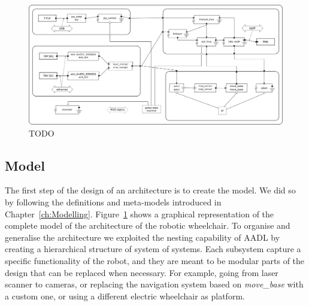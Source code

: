 \begin{landscape}
	\begin{figure}[t]
	\centering
	\includegraphics[width=0.95\textheight]{gfx/pmk/model}
	\caption{TODO}
	\label{fig:pmk-model}
	\end{figure}
\end{landscape}


\subsection{Model}
\label{sec:pmk-model}
The first step of the design of an architecture is to create the model. We did so by following the definitions and meta-models introduced in Chapter~\ref{ch:Modelling}. Figure~\ref{fig:pmk-model} shows a graphical representation of the complete model of the architecture of the robotic wheelchair. To organise and generalise the architecture we exploited the nesting capability of AADL by creating a hierarchical structure of system of systems. Each subsystem capture a specific functionality of the robot, and they are meant to be modular parts of the design that can be replaced when necessary. For example, going from laser scanner to cameras, or replacing the navigation system based on \textit{move\_base} with a custom one, or using a different electric wheelchair as platform.

